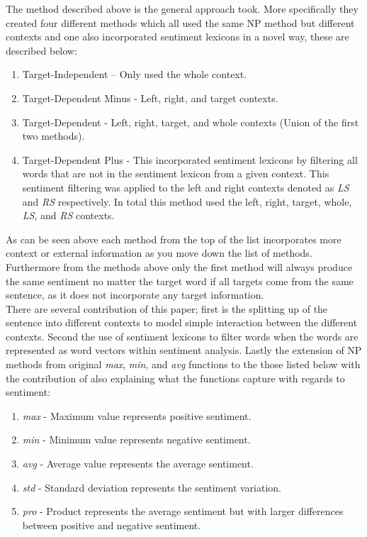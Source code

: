 The method described above is the general approach \citet{repro_vo_2015} took. More specifically they created four different methods which all used the same NP method but different contexts and one also incorporated sentiment lexicons in a novel way, these are described below:
\begin{enumerate}
    \item Target-Independent -- Only used the whole context.
    \item Target-Dependent Minus - Left, right, and target contexts.
    \item Target-Dependent - Left, right, target, and whole contexts (Union of the first two methods).
    \item Target-Dependent Plus - This incorporated sentiment lexicons by filtering all words that are not in the sentiment lexicon from a given context. This sentiment filtering was applied to the left and right contexts denoted as \textit{LS} and \textit{RS} respectively. In total this method used the left, right, target, whole, \textit{LS}, and \textit{RS} contexts.
\end{enumerate}
As can be seen above each method from the top of the list incorporates more context or external information as you move down the list of methods. Furthermore from the methods above only the first method will always produce the same sentiment no matter the target word if all targets come from the same sentence, as it does not incorporate any target information.\\
There are several contribution of this paper; first is the splitting up of the sentence into different contexts to model simple interaction between the different contexts. Second the use of sentiment lexicons to filter words when the words are represented as word vectors within sentiment analysis. Lastly the extension of NP methods from \citet{repro_tang_2014} original \textit{max}, \textit{min}, and \textit{avg} functions to the those listed below with the contribution of also explaining what the functions capture with regards to sentiment:
\begin{enumerate}
    \item \textit{max} - Maximum value represents positive sentiment.
    \item \textit{min} - Minimum value represents negative sentiment.
    \item \textit{avg} - Average value represents the average sentiment.
    \item \textit{std} - Standard deviation represents the sentiment variation.
    \item \textit{pro} - Product represents the average sentiment but with larger differences between positive and negative sentiment.
\end{enumerate}

